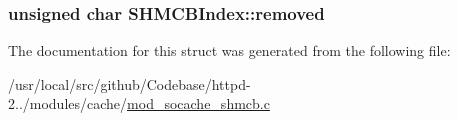 \subsubsection[{\texorpdfstring{removed}{removed}}]{\setlength{\rightskip}{0pt plus 5cm}unsigned char S\+H\+M\+C\+B\+Index\+::removed}\hypertarget{structSHMCBIndex_a6f9ec87ffd84627a9fa1612fa5eb28fb}{}\label{structSHMCBIndex_a6f9ec87ffd84627a9fa1612fa5eb28fb}


The documentation for this struct was generated from the following file\+:\begin{DoxyCompactItemize}
\item 
/usr/local/src/github/\+Codebase/httpd-\/2../modules/cache/\hyperlink{mod__socache__shmcb_8c}{mod\+\_\+socache\+\_\+shmcb.\+c}\end{DoxyCompactItemize}
